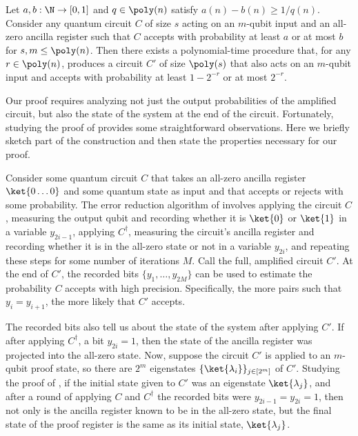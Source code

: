 \documentclass{toc}
\begin{document}
\begin{theorem}\label{thm:MW}
	Let $a,b:\N\rightarrow [0,1]$ and $q\in \poly(n)$ satisfy $a(n)-b(n)\geq 1/q(n)$.
	Consider any quantum circuit $C$
	of size $s$
	acting on an $m$-qubit input and an all-zero ancilla register
%
	such that $C$ accepts with probability at least $a$ or at most $b$ %
	for $s,m\leq\poly(n)$.
	Then there exists a polynomial-time procedure
	that, for any $r\in\poly(n)$,
	produces a circuit $C'$
	of size $\poly(s)$ that also
	acts on an $m$-qubit input
%
	and accepts with probability at least %
	$1-2^{-r}$ or at most $2^{-r}$.
%
\end{theorem}

Our proof requires analyzing not just the output probabilities of the amplified circuit,
but also the state of the system at the end of the circuit.
Fortunately, studying the proof of \cite[Theorem 3.3]{marriott2005quantum} provides some straightforward observations.
Here we briefly sketch part of the construction and then state the properties necessary for our proof.

Consider some quantum circuit $C$ that takes an all-zero ancilla register $\ket{0\dots 0}$ and some quantum state as input
and that accepts or rejects with some probability.
The error reduction algorithm of \cite{marriott2005quantum} involves
applying the circuit $C$,
measuring the output qubit and
recording whether it is $\ket{0}$ or $\ket{1}$ in a variable $y_{2i-1}$,
applying $C^{\dagger}$, 
measuring the circuit's ancilla register and
recording whether it is
in the all-zero
state or not in a variable $y_{2i}$, and repeating these steps for some number of
iterations $M$.
Call the full, amplified circuit $C'$.
At the end of $C'$, the recorded bits $\{y_1,\dots,y_{2M}\}$ can be used to estimate the probability $C$ accepts
with high precision. 
Specifically, the more pairs such that $y_i = y_{i+1}$, the more likely that $C'$ accepts.

The recorded bits also tell us about the state of the system after applying $C'$.
If after applying $C^\dagger$, a bit $y_{2i}=1$,
then the state of the ancilla register was projected into the all-zero state.
Now, suppose the circuit $C'$ is applied to an $m$-qubit proof state,
so there are $2^m$ eigenstates $\{\ket{\lambda_i}\}_{j\in [2^m]}$ of $C'$.
Studying the proof of \cite{marriott2005quantum},
if the initial state given to $C'$ was an eigenstate $\ket{\lambda_j}$,
and after a round of applying $C$ and $C^\dagger$ the recorded bits were $y_{2i-1}=y_{2i}=1$,
then not only is the ancilla register known to be in the all-zero state,
but the final state of the proof register is the same as its initial state,
$\ket{\lambda_j}$.
\end{document}
